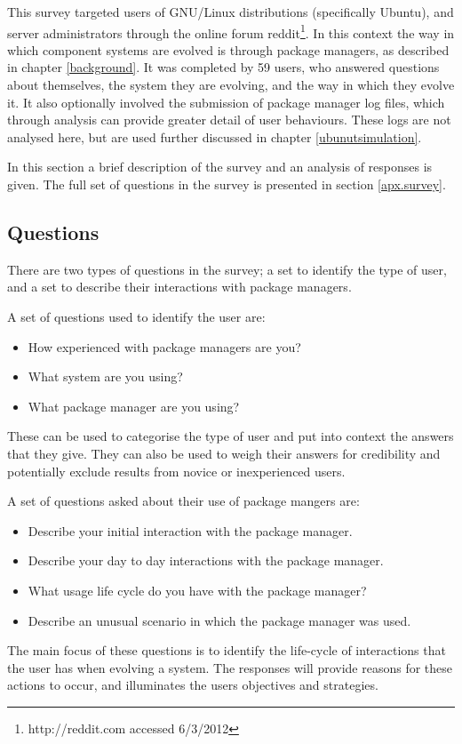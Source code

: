 This survey targeted users of GNU/Linux distributions (specifically Ubuntu), and server administrators through the online forum reddit\footnote{http://reddit.com accessed 6/3/2012}.
In this context the way in which component systems are evolved is through package managers, as described in chapter \ref{background}.
It was completed by 59 users, who answered questions about themselves, the system they are evolving, and the way in which they evolve it.
It also optionally involved the submission of package manager log files, which through analysis can provide greater detail of user behaviours.
These logs are not analysed here, but are used further discussed in chapter \ref{ubunutsimulation}.

In this section a brief description of the survey and an analysis of responses is given.
The full set of questions in the survey is presented in section \ref{apx.survey}. 

\subsection{Questions}
There are two types of questions in the survey; a set to identify the type of user, and a set to describe their interactions with package managers.

A set of questions used to identify the user are:
\begin{itemize}
  \item How experienced with package managers are you? 
  \item What system are you using?
  \item What package manager are you using?
\end{itemize}
These can be used to categorise the type of user and put into context the answers that they give.
They can also be used to weigh their answers for credibility and potentially exclude results from novice or inexperienced users. 

A set of questions asked about their use of package mangers are:
\begin{itemize}
  \item Describe your initial interaction with the package manager.
  \item Describe your day to day interactions with the package manager.
  \item What usage life cycle do you have with the package manager?
  \item Describe an unusual scenario in which the package manager was used.
\end{itemize}
The main focus of these questions is to identify the life-cycle of interactions that the user has when evolving a system.
The responses will provide reasons for these actions to occur, and illuminates the users objectives and strategies.

